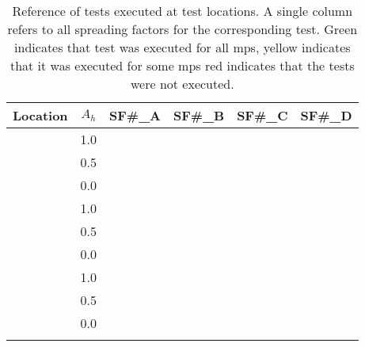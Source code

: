 \begin{table}[H]
\centering\small
\caption[Reference of tests executed at test locations]{Reference of tests executed at test locations. A single column refers to all spreading factors for the corresponding test. Green indicates that test was executed for all \ac{mp}s, yellow indicates that it was executed for some \ac{mp}s red indicates that the tests were not executed.}
\label{tab:LocationTestReference}
\begin{tabular}{C{2.5cm}|c|C{2cm}C{2cm}C{2cm}C{2cm}}
\toprule
\textbf{Location} & \textbf{$A_h$} & \textbf{SF\#\_A} & \textbf{SF\#\_B} & \textbf{SF\#\_C} & \textbf{SF\#\_D}  \\
\midrule
{} & 1.0 &  &  &  &  \\
& 0.5 &  &  &  &  \\
& 0.0 &  &  &  &  \\
\addlinespace
{} & 1.0 &  &  &  &   \\
& 0.5 &  &  &  &  \\
& 0.0 &  &  &  & \\
\addlinespace
{} & 1.0 &  &  &  &  \\
& 0.5 &  &  &  & \\
& 0.0 &  &  &  & \\
\addlinespace\bottomrule
\end{tabular}
\end{table}

